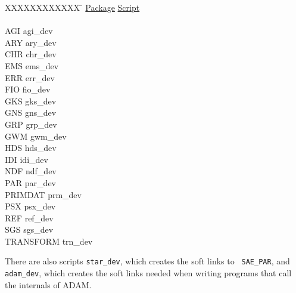 \begin{tabbing}
XXXXXXXXXXXX \= \kill
\underline{Package} \> \underline{Script} \\ \\
AGI \> agi\_dev \\
ARY \> ary\_dev \\
CHR \> chr\_dev \\
EMS \> ems\_dev \\
ERR \> err\_dev \\
FIO \> fio\_dev \\
GKS \> gks\_dev \\
GNS \> gns\_dev \\
GRP \> grp\_dev \\
GWM \> gwm\_dev \\
HDS \> hds\_dev \\
IDI \> idi\_dev \\
NDF \> ndf\_dev \\
PAR \> par\_dev \\
PRIMDAT \> prm\_dev \\
PSX \> psx\_dev \\
REF \> ref\_dev \\
SGS \> sgs\_dev \\
TRANSFORM \> trn\_dev
\end{tabbing}

There are also scripts {\tt star\_dev}, which creates the soft links to {\tt
SAE\_PAR}, and {\tt adam\_dev}, which creates the soft links needed when
writing programs that call the internals of ADAM.


